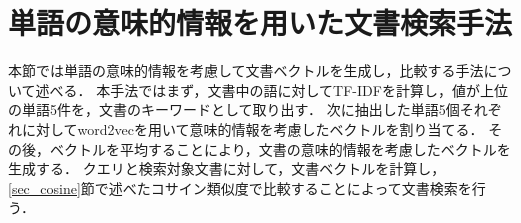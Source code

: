 \section{単語の意味的情報を用いた文書検索手法}  \label{sec_word2vec}
%
本節では単語の意味的情報を考慮して文書ベクトルを生成し，比較する手法について述べる．
本手法ではまず，文書中の語に対してTF-IDFを計算し，値が上位の単語5件を，文書のキーワードとして取り出す．
次に抽出した単語5個それぞれに対してword2vecを用いて意味的情報を考慮したベクトルを割り当てる．
その後，ベクトルを平均することにより，文書の意味的情報を考慮したベクトルを生成する．
クエリと検索対象文書に対して，文書ベクトルを計算し，\ref{sec_cosine}節で述べたコサイン類似度で比較することによって文書検索を行う．


